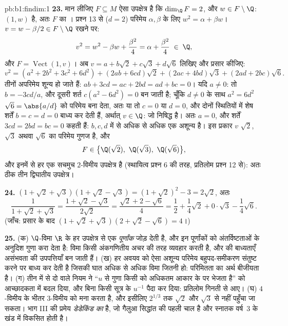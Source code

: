 \begin{solution}{pb:b1:findim:1}
\textbf{23.} मान लीजिए $F \subseteq M$ ऐसा उपक्षेत्र है कि $\dim_\Q F = 2$,
और $w \in F \setminus \Q$: $(1, w)$  है, अतः $F$ का । प्रश्न 13
से ($d = 2$) परिमेय $\alpha, \beta$ के लिए $w^2 = \alpha + \beta w$। $v = w
- \beta/2 \in F \setminus \Q$ रखने पर:
\[
v^2 = w^2 - \beta w + \frac{\beta^2}4 = \alpha + \frac{\beta^2}4
\;\in\; \Q,
\]
और $F = \operatorname{Vect}(1, v)$। अब $v = a + b\sqrt2 + c\sqrt3 + d\sqrt6$
लिखिए और प्रसार कीजिए:
\[
v^2 = (a^2 + 2b^2 + 3c^2 + 6d^2)
+ (2ab + 6cd)\sqrt2 + (2ac + 4bd)\sqrt3 + (2ad + 2bc)\sqrt6 .
\]
तीनों अपरिमेय  शून्य हो जाते हैं: $ab + 3cd = ac + 2bd = ad + bc =
0$। यदि $a \neq 0$: तो $b = -3cd/a$, और दूसरी शर्त $c(a^2 - 6d^2) = 0$ बन
जाती है; चूँकि $d \neq 0$ के साथ $a^2 = 6d^2$ $\sqrt6 = \abs{a/d}$ को परिमेय
बना देता, अतः या तो $c = 0$ या $d = 0$, और दोनों स्थितियों में शेष शर्तें $b
= c = d = 0$ बाध्य कर देती हैं, अर्थात् $v \in \Q$: जो निषिद्ध है। अतः $a =
0$, और शर्तें $3cd = 2bd = bc = 0$ कहती हैं: $b, c, d$ में से अधिक से अधिक
एक अशून्य है। इस प्रकार $v$ $\sqrt2$, $\sqrt3$ अथवा $\sqrt6$ का परिमेय गुणज
है, और
\[
F \in \bigl\{\Q(\sqrt2),\ \Q(\sqrt3),\ \Q(\sqrt6)\bigr\} ,
\]
और इनमें से हर एक सचमुच $2$-विमीय उपक्षेत्र है (स्थायित्व प्रश्न 6 की तरह,
प्रतिलोम प्रश्न 12 से): अतः ठीक तीन द्विघातीय उपक्षेत्र।

\textbf{24.} $(1 + \sqrt2 + \sqrt3)(1 + \sqrt2 - \sqrt3) = (1 + \sqrt2)^2 -
3 = 2\sqrt2$, अतः
\[
\frac1{1 + \sqrt2 + \sqrt3}
= \frac{1 + \sqrt2 - \sqrt3}{2\sqrt2}
= \frac{\sqrt2 + 2 - \sqrt6}{4}
= \frac12 + \frac14\sqrt2 + 0\cdot\sqrt3 - \frac14\sqrt6 .
\]
(जाँच: प्रसार के बाद $(1 + \sqrt2 + \sqrt3)(2 + \sqrt2 - \sqrt6) = 4$।)

\textbf{25.} (क) $\Q$-विमा $\R$ के हर उपक्षेत्र से एक \emph{पूर्णांक} जोड़
देती है, और  इन पूर्णांकों को अंतर्विष्टताओं के अनुदिश गुणा करा
देता है: विमा किसी अंकगणितीय अचर की तरह व्यवहार करती है, और  की
बाध्यताएँ असंभवता की उपपत्तियाँ बन जाती हैं। (ख)  हर अवयव को ऐसा
अशून्य परिमेय बहुपद-समीकरण संतुष्ट करने पर बाध्य कर देती है जिसकी घात अधिक
से अधिक विमा जितनी हो: परिमितता का अर्थ बीजीयता है। (ग) तीन में से दो वाले
नियम ने ``$u$ से गुणा किसी  को अधिकतम आकार के  पर भेजता है''
को आच्छादकता में बदल दिया, और बिना किसी सूत्र के $u^{-1}$ पैदा कर दिया:
प्रतिलोम गिनती से आए। (घ)  $4$-विमीय  के भीतर $3$-विमीय
 को मना करता है, और इसीलिए $2^{1/3}$ तक $\sqrt2$ और $\sqrt3$ से नहीं
पहुँचा जा सकता। भाग III की प्रमेय \emph{डेडेकिंड का } है, जो गैलुआ
सिद्धांत की पहली चाल है और स्नातक वर्ष~3 के खंड में विकसित होती है।
\end{solution}
